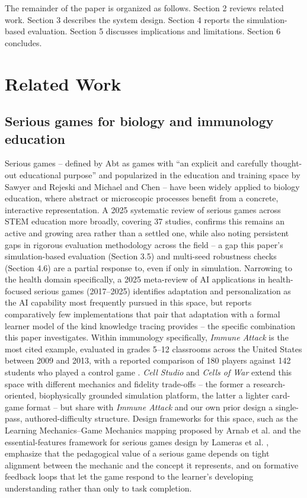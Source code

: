 \documentclass[11pt]{article}
\begin{document}
The remainder of the paper is organized as follows. Section 2 reviews related work. Section 3 describes the system design. Section 4 reports the simulation-based evaluation. Section 5 discusses implications and limitations. Section 6 concludes.

\section{Related Work}

\subsection{Serious games for biology and immunology education}

Serious games -- defined by Abt as games with ``an explicit and carefully thought-out educational purpose'' \cite{ref13} and popularized in the education and training space by Sawyer and Rejeski \cite{ref14} and Michael and Chen \cite{ref15} -- have been widely applied to biology education, where abstract or microscopic processes benefit from a concrete, interactive representation. A 2025 systematic review of serious games across STEM education more broadly, covering 37 studies, confirms this remains an active and growing area rather than a settled one, while also noting persistent gaps in rigorous evaluation methodology across the field \cite{ref31} -- a gap this paper's simulation-based evaluation (Section 3.5) and multi-seed robustness checks (Section 4.6) are a partial response to, even if only in simulation. Narrowing to the health domain specifically, a 2025 meta-review of AI applications in health-focused serious games (2017--2025) identifies adaptation and personalization as the AI capability most frequently pursued in this space, but reports comparatively few implementations that pair that adaptation with a formal learner model of the kind knowledge tracing provides \cite{ref36} -- the specific combination this paper investigates. Within immunology specifically, \textit{Immune Attack} \cite{ref8} is the most cited example, evaluated in grades 5--12 classrooms across the United States between 2009 and 2013, with a reported comparison of 180 players against 142 students who played a control game \cite{ref28}. \textit{Cell Studio} \cite{ref6} and \textit{Cells of War} \cite{ref7} extend this space with different mechanics and fidelity trade-offs -- the former a research-oriented, biophysically grounded simulation platform, the latter a lighter card-game format -- but share with \textit{Immune Attack} and our own prior design \cite{ref9} a single-pass, authored-difficulty structure. Design frameworks for this space, such as the Learning Mechanics--Game Mechanics mapping proposed by Arnab et al. \cite{ref11} and the essential-features framework for serious games design by Lameras et al. \cite{ref12}, emphasize that the pedagogical value of a serious game depends on tight alignment between the mechanic and the concept it represents, and on formative feedback loops that let the game respond to the learner's developing understanding rather than only to task completion.
\end{document}
